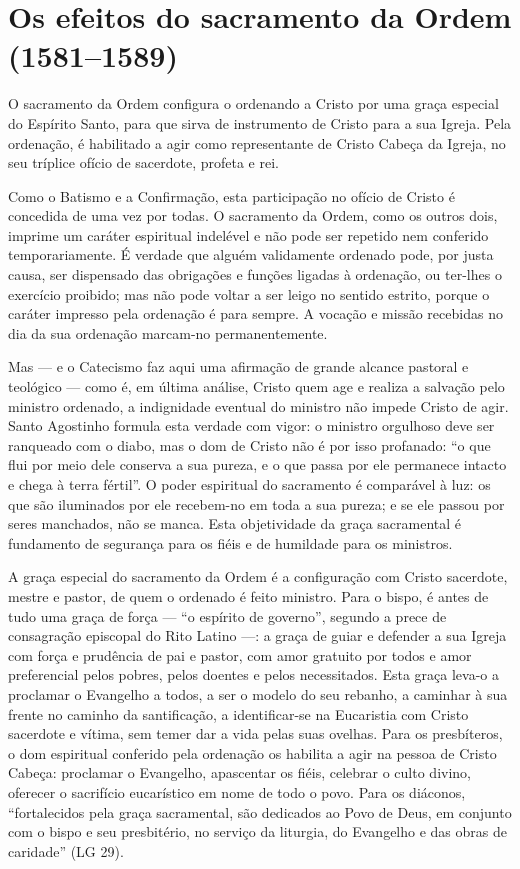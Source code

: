 \section{Os efeitos do sacramento da Ordem (1581--1589)}

O sacramento da Ordem configura o ordenando a Cristo por uma graça especial do Espírito Santo, para que sirva de instrumento de Cristo para a sua Igreja. Pela ordenação, é habilitado a agir como representante de Cristo Cabeça da Igreja, no seu tríplice ofício de sacerdote, profeta e rei.

Como o Batismo e a Confirmação, esta participação no ofício de Cristo é concedida de uma vez por todas. O sacramento da Ordem, como os outros dois, imprime um caráter espiritual indelével e não pode ser repetido nem conferido temporariamente. É verdade que alguém validamente ordenado pode, por justa causa, ser dispensado das obrigações e funções ligadas à ordenação, ou ter-lhes o exercício proibido; mas não pode voltar a ser leigo no sentido estrito, porque o caráter impresso pela ordenação é para sempre. A vocação e missão recebidas no dia da sua ordenação marcam-no permanentemente.

Mas --- e o Catecismo faz aqui uma afirmação de grande alcance pastoral e teológico --- como é, em última análise, Cristo quem age e realiza a salvação pelo ministro ordenado, a indignidade eventual do ministro não impede Cristo de agir. Santo Agostinho formula esta verdade com vigor: o ministro orgulhoso deve ser ranqueado com o diabo, mas o dom de Cristo não é por isso profanado: ``o que flui por meio dele conserva a sua pureza, e o que passa por ele permanece intacto e chega à terra fértil''. O poder espiritual do sacramento é comparável à luz: os que são iluminados por ele recebem-no em toda a sua pureza; e se ele passou por seres manchados, não se manca. Esta objetividade da graça sacramental é fundamento de segurança para os fiéis e de humildade para os ministros.

A graça especial do sacramento da Ordem é a configuração com Cristo sacerdote, mestre e pastor, de quem o ordenado é feito ministro. Para o bispo, é antes de tudo uma graça de força --- ``o espírito de governo'', segundo a prece de consagração episcopal do Rito Latino ---: a graça de guiar e defender a sua Igreja com força e prudência de pai e pastor, com amor gratuito por todos e amor preferencial pelos pobres, pelos doentes e pelos necessitados. Esta graça leva-o a proclamar o Evangelho a todos, a ser o modelo do seu rebanho, a caminhar à sua frente no caminho da santificação, a identificar-se na Eucaristia com Cristo sacerdote e vítima, sem temer dar a vida pelas suas ovelhas. Para os presbíteros, o dom espiritual conferido pela ordenação os habilita a agir na pessoa de Cristo Cabeça: proclamar o Evangelho, apascentar os fiéis, celebrar o culto divino, oferecer o sacrifício eucarístico em nome de todo o povo. Para os diáconos, ``fortalecidos pela graça sacramental, são dedicados ao Povo de Deus, em conjunto com o bispo e seu presbitério, no serviço da liturgia, do Evangelho e das obras de caridade'' (LG 29).

